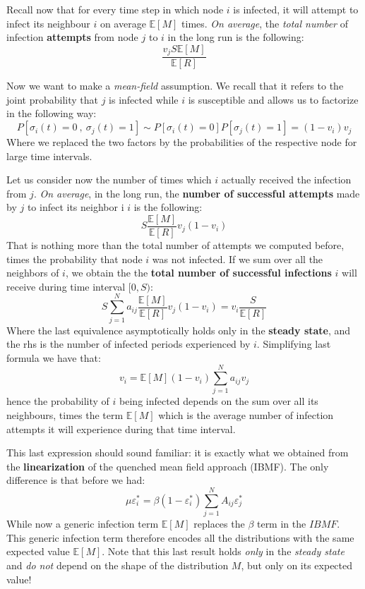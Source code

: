 \documentclass[../main/main.tex]{subfiles}
\begin{document}
Recall now that for every time step in which node $i$ is infected, it will attempt to infect its neighbour $i$ on average \(\mathbb{E} [M] \) times. \textit{On average}, the \textit{total number} of infection \textbf{attempts} from node $j$ to $i$ in the long run is the following:
\begin{equation*}
    \frac{v_j S\mathbb{E}[M]}{ \mathbb{E}[R] }
\end{equation*}

Now we want to make a \textit{mean-field} assumption. We recall that it refers to the joint probability that $j$ is infected while $i$ is susceptible and allows us to factorize in the following way:
\begin{equation*}
    P[\sigma_i(t) = 0\ ,\ \sigma_j(t) = 1 ] \sim P[\sigma_i(t) = 0] P[\sigma_j(t) = 1 ] = (1-v_i) v_j  
\end{equation*}
Where we replaced the two factors by the probabilities of the respective node for large time intervals.

Let us consider now the number of times which \( i \) actually received the infection from \( j \). \textit{On average}, in the long run, the \textbf{number of successful attempts} made by $j$ to infect its neighbor i $i$ is the following:
\begin{equation*}
S \frac{\mathbb{E}[M]}{\mathbb{E}[R]} v_{j} (1-v_i)
\end{equation*}
That is nothing more than the total number of attempts we computed before, times the probability that node $i$ was not infected.
If we sum over all the neighbors of $i$, we obtain the the \textbf{total number of successful infections} $i$ will receive during time interval $[0,S)$:
\begin{equation*}
  S \sum_{j=1}^{N}  a_{ij} \frac{\mathbb{E}[M]}{\mathbb{E}[R]} v_{j} (1-v_i) = v_i \frac{S}{\mathbb{E}[R]}
\end{equation*}
Where the last equivalence asymptotically holds only in the \textbf{steady state}, and the rhs is the number of infected periods experienced by $i$.
Simplifying last formula we have that:
\begin{equation*}
  v_i = \mathbb{E}[M] (1- v_i) \sum_{j=1}^{N} a_{ij} v_j
\end{equation*}
hence the probability of $i$ being infected depends on the sum over all its neighbours, times the term \( \mathbb{E}[M] \) which is the average number of infection attempts it will experience during that time interval.

This last expression should sound familiar: it is exactly what we obtained from the \textbf{linearization} of the quenched mean field approach (IBMF). The only difference is that before we had:
\begin{equation*}
  \mu \varepsilon_i^* = \beta (1 - \varepsilon_i^*) \sum_{j=1}^N A_{ij}\varepsilon_j^*
\end{equation*}
While now a generic infection term \( \mathbb{E}[M] \) replaces the $\beta$ term in the $IBMF$. This generic infection term therefore encodes all the distributions with the same expected value $\mathbb{E}[M]$. Note that this last result holds \textit{only} in the \textit{steady state} and \textit{do not} depend on the shape of the distribution $M$, but only on its expected value!
\end{document}
